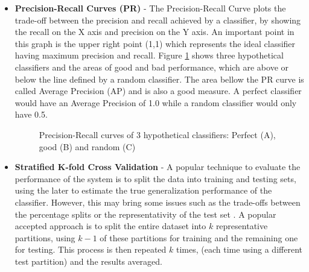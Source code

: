 \begin{itemize}
\item \textbf{Precision-Recall Curves (PR)} - The Precision-Recall Curve plots the trade-off between the precision and recall achieved by a classifier, by showing the recall on the X axis and precision on the Y axis. An important point in this graph is the upper right point (1,1) which represents the ideal classifier having maximum precision and recall. Figure \ref{fig:pr} shows three hypothetical classifiers and the areas of good and bad performance, which are above or below the line defined by a random classifier. The area bellow the PR curve is called Average Precision (AP) and is also a good measure. A perfect classifier would have an Average Precision of 1.0 while a random classifier would only have 0.5. 

\begin{figure}[htp]
	\centering
	\caption[Precision-Recall curves of 3 hypothetical classifiers]{Precision-Recall curves of 3 hypothetical classifiers: Perfect (A), good (B) and random (C)}
	\label{fig:pr}
\end{figure}

\item \textbf{Stratified K-fold Cross Validation} - A popular technique to evaluate the performance of the system is to split the data into training and testing sets, using the later to estimate the true generalization performance of the classifier. However, this may bring some issues such as the trade-offs between the percentage splits or the representativity of the test set \citep{Polikar2006PR}. A popular accepted approach is to split the entire dataset into $k$ representative partitions, using $k-1$ of these partitions for training and the remaining one for testing. This process is then repeated $k$ times, (each time using a different test partition) and the results averaged. 
\end{itemize}

